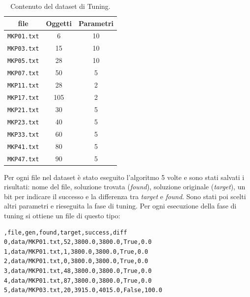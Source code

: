 \begin{table}[H]
    \centering
    \begin{tabular}{||c||c||c||}
        \textbf{file}    & \textbf{Oggetti} & \textbf{Parametri} \\
        \hline
        \verb|MKP01.txt| & 6                & 10                 \\
        \verb|MKP03.txt| & 15               & 10                 \\
        \verb|MKP05.txt| & 28               & 10                 \\
        \verb|MKP07.txt| & 50               & 5                  \\
        \verb|MKP11.txt| & 28               & 2                  \\
        \verb|MKP17.txt| & 105              & 2                  \\
        \verb|MKP21.txt| & 30               & 5                  \\
        \verb|MKP23.txt| & 40               & 5                  \\
        \verb|MKP33.txt| & 60               & 5                  \\
        \verb|MKP41.txt| & 80               & 5                  \\
        \verb|MKP47.txt| & 90               & 5
    \end{tabular}
    \caption{Contenuto del dataset di Tuning.}
\end{table}

Per ogni file nel dataset è stato eseguito l'algoritmo 5 volte e sono stati
salvati i risultati: nome del file, soluzione trovata (\textit{found}),
soluzione originale (\textit{target}), un bit per indicare il successo e la
differenza tra \textit{target} e \textit{found}. Sono stati poi scelti altri
parametri e rieseguita la fase di tuning.
Per ogni esecuzione della fase di tuning si ottiene un file di
questo tipo:\\

\begin{minipage}{\textwidth}
    \begin{lstlisting}
,file,gen,found,target,success,diff
0,data/MKP01.txt,52,3800.0,3800.0,True,0.0
1,data/MKP01.txt,1,3800.0,3800.0,True,0.0
2,data/MKP01.txt,0,3800.0,3800.0,True,0.0
3,data/MKP01.txt,48,3800.0,3800.0,True,0.0
4,data/MKP01.txt,87,3800.0,3800.0,True,0.0
5,data/MKP03.txt,20,3915.0,4015.0,False,100.0
\end{lstlisting}
\end{minipage}\\

